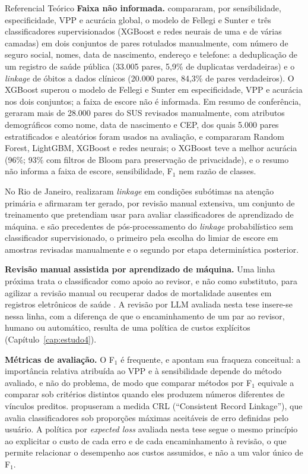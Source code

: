 \begin{chapter}{Referencial Teórico}
\textbf{Faixa não informada.}  compararam, por sensibilidade, especificidade, VPP e acurácia global, o modelo de Fellegi e Sunter e três classificadores supervisionados (XGBoost e redes neurais de uma e de várias camadas) em dois conjuntos de pares rotulados manualmente, com número de seguro social, nomes, data de nascimento, endereço e telefone: a deduplicação de um registro de saúde pública (33.005 pares, 5,9\% de duplicatas verdadeiras) e o \textit{linkage} de óbitos a dados clínicos (20.000 pares, 84,3\% de pares verdadeiros). O XGBoost superou o modelo de Fellegi e Sunter em especificidade, VPP e acurácia nos dois conjuntos; a faixa de escore não é informada. Em resumo de conferência,  geraram mais de 28.000 pares do SUS revisados manualmente, com atributos demográficos como nome, data de nascimento e CEP, dos quais 5.000 pares estratificados e aleatórios foram usados na avaliação, e compararam Random Forest, LightGBM, XGBoost e redes neurais; o XGBoost teve a melhor acurácia (96\%; 93\% com filtros de Bloom para preservação de privacidade), e o resumo não informa a faixa de escore, sensibilidade, F$_1$ nem razão de classes.

No Rio de Janeiro,  realizaram \textit{linkage} em condições subótimas na atenção primária e afirmaram ter gerado, por revisão manual extensiva, um conjunto de treinamento que pretendiam usar para avaliar classificadores de aprendizado de máquina.  e  são precedentes de pós-processamento do \textit{linkage} probabilístico sem classificador supervisionado, o primeiro pela escolha do limiar de escore em amostras revisadas manualmente e o segundo por etapa determinística posterior.

\textbf{Revisão manual assistida por aprendizado de máquina.} Uma linha próxima trata o classificador como apoio ao revisor, e não como substituto, para agilizar a revisão manual \cite{Shahriar2020clerical} ou recuperar dados de mortalidade ausentes em registros eletrônicos de saúde \cite{Powers2025recovering}. A revisão por LLM avaliada nesta tese insere-se nessa linha, com a diferença de que o encaminhamento de um par ao revisor, humano ou automático, resulta de uma política de custos explícitos (Capítulo~\ref{cap:estudo4}).

\textbf{Métricas de avaliação.} O F$_1$ é frequente, e  apontam sua fraqueza conceitual: a importância relativa atribuída ao VPP e à sensibilidade depende do método avaliado, e não do problema, de modo que comparar métodos por F$_1$ equivale a comparar sob critérios distintos quando eles produzem números diferentes de vínculos preditos.  propuseram a medida CRL (``Consistent Record Linkage''), que avalia classificadores sob proporções máximas aceitáveis de erro definidas pelo usuário. A política por \textit{expected loss} avaliada nesta tese segue o mesmo princípio ao explicitar o custo de cada erro e de cada encaminhamento à revisão, o que permite relacionar o desempenho aos custos assumidos, e não a um valor único de F$_1$.


\end{chapter}
